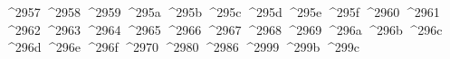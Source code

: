 {  ^^^^2957%
  ^^^^2958%
  ^^^^2959%
  ^^^^295a%
  ^^^^295b%
  ^^^^295c%
  ^^^^295d%
  ^^^^295e%
  ^^^^295f%
  ^^^^2960%
  ^^^^2961%
  ^^^^2962%
  ^^^^2963%
  ^^^^2964%
  ^^^^2965%
  ^^^^2966%
  ^^^^2967%
  ^^^^2968%
  ^^^^2969%
  ^^^^296a%
  ^^^^296b%
  ^^^^296c%
  ^^^^296d%
  ^^^^296e%
  ^^^^296f%
  ^^^^2970%
  ^^^^2980%
  ^^^^2986%
  ^^^^2999%
  ^^^^299b%
  ^^^^299c%
}
